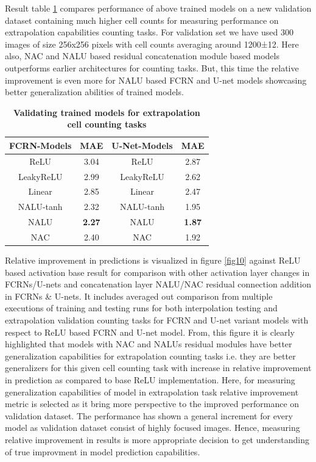 \documentclass[runningheads]{llncs}
\begin{document}
Result table \ref{tab:table3} compares performance of above trained models on a new validation dataset containing much higher cell counts for measuring performance on extrapolation capabilities counting tasks. For validation set we have used 300 images of size 256x256 pixels with cell counts averaging around 1200±12. Here also, NAC and NALU based residual concatenation module based models outperforms earlier architectures for counting tasks. But, this time the relative improvement is even more for NALU based FCRN and U-net models showcasing better generalization abilities of trained models.

\bgroup
\def\arraystretch{1.25}
\begin{table}[h!]
  \begin{center}
    \caption{\textbf{Validating trained models for extrapolation cell counting tasks}}
    \label{tab:table3}
    \begin{tabular}{|c|c|c|c|}
     
         \hline
      \textbf{FCRN-Models} & \textbf{MAE} & \textbf{U-Net-Models} & \textbf{MAE} \\
    \hline

     ReLU  & 3.04 & ReLU & 2.87\\
     LeakyReLU  & 2.99 & LeakyReLU & 2.62\\
     Linear  & 2.85 & Linear & 2.47\\
	 NALU-tanh & 2.32 & NALU-tanh & 1.95\\
	 NALU & \textbf{2.27} & NALU & \textbf{1.87}\\
     NAC & 2.40 & NAC & 1.92\\
    
     \hline
     \end{tabular}
  \end{center}
\end{table}
\egroup

Relative improvement in predictions is visualized in figure \ref{fig10} against ReLU based activation base result for comparison with other activation layer changes in FCRNs/U-nets and concatenation layer NALU/NAC residual connection addition in FCRNs \& U-nets. It includes averaged out comparison from multiple executions of training and testing runs for both interpolation testing and extrapolation validation counting tasks for FCRN and U-net variant models with respect to ReLU based FCRN and U-net model. From, this figure it is clearly highlighted that models with NAC and NALUs residual modules have better generalization capabilities for extrapolation counting tasks i.e. they are better generalizers for this given cell counting task with increase in relative improvement in prediction as compared to base ReLU implementation. Here, for measuring generalization capabilities of model in extrapolation task relative improvement metric is selected as it bring more perspective to the improved performance on validation dataset. The performance has shown a general increment for every model as validation dataset consist of highly focused images. Hence, measuring relative improvement in results is more appropriate decision to get understanding of true improvment in model prediction capabilities.
\end{document}
